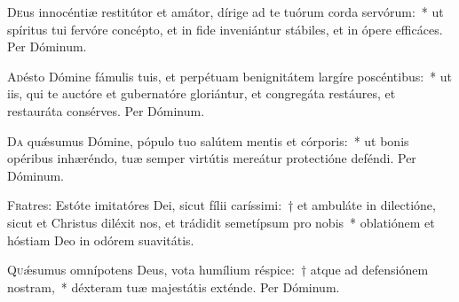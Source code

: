 \documentclass[vesperale_romanum.tex]{subfiles}
\begin{document}
\oratio

\lettrine{D}{e}us innocéntiæ restitútor et amátor, dírige ad te tuórum corda servórum:~* ut spíritus tui fervóre concépto, et in fide inveniántur stábiles, et in ópere efficáces. Per Dóminum.



\oratio

\lettrine{A}{d}ésto Dómine fámulis tuis, et perpétuam benignitátem largíre poscéntibus:~* ut iis, qui te auctóre et gubernatóre gloriántur, et congregáta restáures, et restauráta consérves. Per Dóminum.



\oratio

\lettrine{D}{a} quǽsumus Dómine, pópulo tuo salútem mentis et córporis:~* ut bonis opéribus inhæréndo, tuæ semper virtútis mereátur protectióne deféndi. Per Dóminum.



\lettrine{F}{r}atres: Estóte imitatóres Dei, sicut fílii caríssimi:~† et ambuláte in dilectióne, sicut et Christus diléxit nos, et trádidit semetípsum pro nobis~* oblatiónem et hóstiam Deo in odórem suavitátis.



\oratio

\lettrine{Q}{u}ǽsumus omnípotens Deus, vota humílium réspice:~† atque ad defensiónem nostram,~* déxteram tuæ majestátis exténde.
Per Dóminum.



\end{document}
